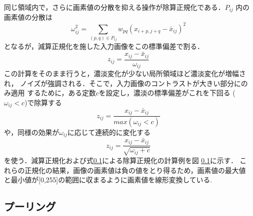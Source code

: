 \documentclass[a4paper,10pt]{jsarticle}
\begin{document}
同じ領域内で，さらに画素値の分散を抑える操作が除算正規化である．$P_{ij}$
内の画素値の分散は
\begin{equation}
 \omega^2_{ij}=\sum_{(p,q)\in{P_{ij}}}^{} w_{pq}(x_{i+p,j+q}-\bar{x}_{ij})^2
\end{equation}
となるが，減算正規化を施した入力画像をこの標準偏差で割る．
\begin{equation}
 z_{ij}=\frac{x_{ij}-\bar{x}_{ij}}{\omega_{ij}} 
\end{equation}
この計算をそのまま行うと，濃淡変化が少ない局所領域ほど濃淡変化が増幅され，
ノイズが強調される．そこで，入力画像のコントラストが大きい部分にのみ適用
するために，ある定数$c$を設定し，濃淡の標準偏差がこれを下回る
($\omega_{ij}<c$)で除算する
\begin{equation}
 z_{ij}=\frac{x_{ij}-\bar{x}_{ij}}{max(\omega_{ij}<c)}
\end{equation}
や，同様の効果が$\omega_{ij}$に応じて連続的に変化する
\begin{equation}
 z_{ij}=\frac{x_{ij}-\bar{x}_{ij}}{\sqrt{\omega_{ij}+c}} 
\end{equation}
を使う．減算正規化および式\ref{}による除算正規化の計算例を図
\ref{}に示す．
これらの正規化の結果，画像の画素値は負の値をとり得るため，画素値の最大値
と最小値が[0,255]の範囲に収まるように画素値を線形変換している.

\subsection{プーリング}

\end{document}
